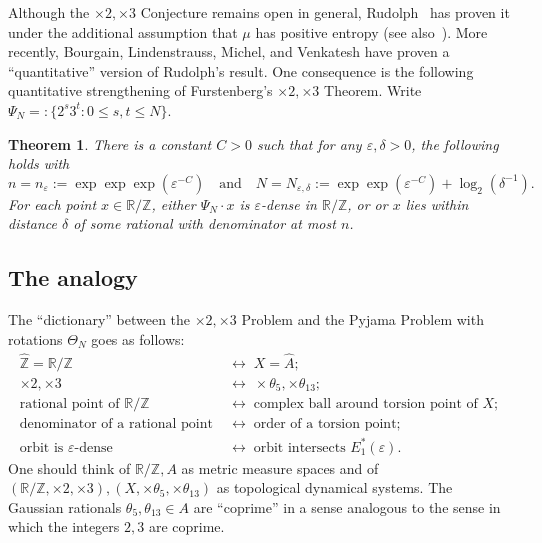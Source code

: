 \documentclass[11pt]{amsart}
\newtheorem{theorem}[lemma]{Theorem}
\theoremstyle{definition}
\newcommand{\R}{{\mathbb R}}
\newcommand{\Z}{{\mathbb Z}}
\begin{document}
Although the $\times 2, \times 3$ Conjecture remains open in general, Rudolph~\cite{rudolph19902} has proven it under the additional assumption that $\mu$ has positive entropy (see also~\cite{johnson1992measures,parry1996squaring,host1995nombres}).  More recently, Bourgain, Lindenstrauss, Michel, and Venkatesh \cite{BLMV08} have proven a ``quantitative'' version of Rudolph's result.  One consequence is the following quantitative strengthening of Furstenberg's $\times 2, \times 3$ Theorem.  Write $\Psi_N=:\{2^s 3^t: 0 \leq s,t \leq N\}$.

\begin{theorem}\label{thm:quantitative-furstenberg}
There is a constant $C>0$ such that for any $\varepsilon,\delta>0$, the following holds with
$$n=n_\varepsilon:=\exp\exp\exp(\varepsilon^{-C}) \quad \text{and} \quad N=N_{\varepsilon,\delta}:=\exp\exp(\varepsilon^{-C})+\log_2(\delta^{-1}).$$
For each point $x \in \R/\Z$, either $\Psi_N \cdot x$ is $\varepsilon$-dense in $\R/\Z$, or or $x$ lies within distance $\delta$ of some rational with denominator at most $n$.
\end{theorem}


\subsection{The analogy}

The ``dictionary'' between the $\times 2, \times 3$ Problem and the Pyjama Problem with rotations $\Theta_N$ goes as follows:
\[
\begin{aligned}
\widehat{\mathbb{Z}}=\mathbb{R}/\mathbb{Z} \;&\longleftrightarrow\; X=\widehat{A}; \\
\times 2, \times 3
\;&\longleftrightarrow\;
\times \theta_5, \times \theta_{13}; \\
\text{rational point of $\mathbb{R}/\mathbb{Z}$} \;&\longleftrightarrow\; \text{complex ball around torsion point of $X$}; \\
\text{denominator of a rational point} \;&\longleftrightarrow\; \text{order of a torsion point};\\
\text{orbit is $\varepsilon$-dense} \;&\longleftrightarrow\; \text{orbit intersects $E_1^*(\varepsilon)$}.
\end{aligned}
\]
One should think of $\mathbb{R}/\mathbb{Z},A$ as metric measure spaces and of $(\mathbb{R}/\mathbb{Z},\times 2, \times 3),(X, \times \theta_5, \times \theta_{13})$ as topological dynamical systems.  The Gaussian rationals $\theta_5, \theta_{13} \in A$ are ``coprime'' in a sense analogous to the sense in which the integers $2,3$ are coprime.
\end{document}
